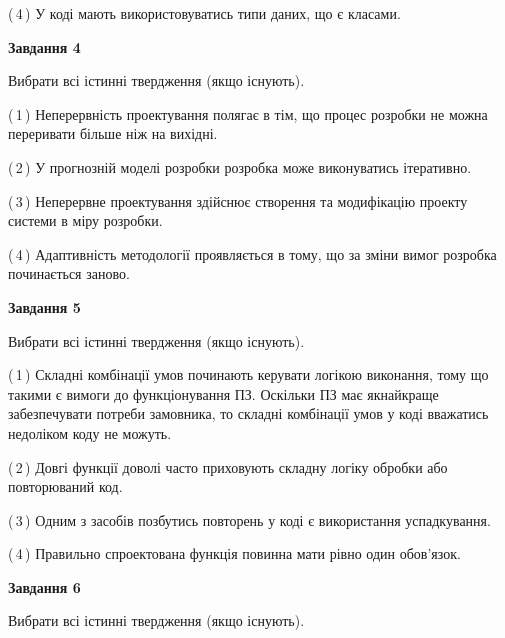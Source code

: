 \documentclass[10pt, ukrainian]{article}
\begin{document}
{\begin {large}
(\,4\,) У коді мають використовуватись типи даних, що є класами. %


{\begin {center}\textbf{Завдання 4}\end {center}}\par
Вибрати всі істинні твердження (якщо існують).\par
\vspace{2mm}



(\,1\,) Неперервність проектування полягає в тім, що процес розробки не можна переривати більше ніж на вихідні. %



(\,2\,) У прогнозній моделі розробки розробка може виконуватись ітеративно. %



(\,3\,) Неперервне проектування здійснює створення та модифікацію проекту системи в міру розробки. %



(\,4\,) Адаптивність методології проявляється в тому, що за зміни вимог розробка починається заново. %


{\begin {center}\textbf{Завдання 5}\end {center}}\par
Вибрати всі істинні твердження (якщо існують).\par
\vspace{2mm}



(\,1\,) Складні комбінації умов починають керувати логікою виконання, тому що такими є вимоги до функціонування ПЗ. Оскільки ПЗ має якнайкраще забезпечувати потреби замовника, то складні комбінації умов у коді вважатись недоліком коду не можуть. %



(\,2\,) Довгі функції доволі часто приховують складну логіку обробки або повторюваний код. %



(\,3\,) Одним з засобів позбутись повторень у коді є використання успадкування. %



(\,4\,) Правильно спроектована функція повинна мати рівно один обов'язок. %

\newpage

{\begin {center}\textbf{Завдання 6}\end {center}}\par
Вибрати всі істинні твердження (якщо існують).\par
\vspace{2mm}




\end{large}}
\end{document}
